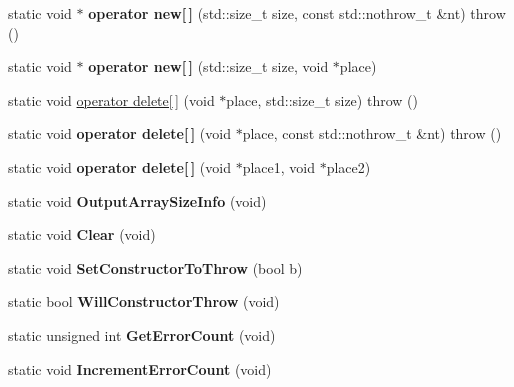 \begin{DoxyCompactItemize}
\item 
\hypertarget{classBee_a373196ddc4b115f952fab9971ffacc80}{}static void $\ast$ {\bfseries operator new\mbox{[}$\,$\mbox{]}} (std\+::size\+\_\+t size, const std\+::nothrow\+\_\+t \&nt)  throw ()\label{classBee_a373196ddc4b115f952fab9971ffacc80}

\item 
\hypertarget{classBee_a1c8abf622d253e80396da8ef80cf9391}{}static void $\ast$ {\bfseries operator new\mbox{[}$\,$\mbox{]}} (std\+::size\+\_\+t size, void $\ast$place)\label{classBee_a1c8abf622d253e80396da8ef80cf9391}

\item 
static void \hyperlink{classBee_af9dc6ba6e0aa4023eb0aad8580e2421b}{operator delete\mbox{[}$\,$\mbox{]}} (void $\ast$place, std\+::size\+\_\+t size)  throw ()
\item 
\hypertarget{classBee_a820869dbb3481a7554e52fbf4497646e}{}static void {\bfseries operator delete\mbox{[}$\,$\mbox{]}} (void $\ast$place, const std\+::nothrow\+\_\+t \&nt)  throw ()\label{classBee_a820869dbb3481a7554e52fbf4497646e}

\item 
\hypertarget{classBee_aabff14c514a6656ec1ac8571ed28aae7}{}static void {\bfseries operator delete\mbox{[}$\,$\mbox{]}} (void $\ast$place1, void $\ast$place2)\label{classBee_aabff14c514a6656ec1ac8571ed28aae7}

\item 
\hypertarget{classBee_ac1ff02f2edcfb06a0019edf9112d1c91}{}static void {\bfseries Output\+Array\+Size\+Info} (void)\label{classBee_ac1ff02f2edcfb06a0019edf9112d1c91}

\item 
\hypertarget{classBee_aa0e72cfda7b506c25065a7cf71a027f3}{}static void {\bfseries Clear} (void)\label{classBee_aa0e72cfda7b506c25065a7cf71a027f3}

\item 
\hypertarget{classBee_ac6733b4e777a4c64ea0232d5d0fc1a64}{}static void {\bfseries Set\+Constructor\+To\+Throw} (bool b)\label{classBee_ac6733b4e777a4c64ea0232d5d0fc1a64}

\item 
\hypertarget{classBee_a222234d63d32a280d1ec85e6abed1fb8}{}static bool {\bfseries Will\+Constructor\+Throw} (void)\label{classBee_a222234d63d32a280d1ec85e6abed1fb8}

\item 
\hypertarget{classBee_aae86e9900c6aa2c83ca345dba200dd2b}{}static unsigned int {\bfseries Get\+Error\+Count} (void)\label{classBee_aae86e9900c6aa2c83ca345dba200dd2b}

\item 
\hypertarget{classBee_a39a16846868cb765ef03ecc593f513c7}{}static void {\bfseries Increment\+Error\+Count} (void)\label{classBee_a39a16846868cb765ef03ecc593f513c7}

\end{DoxyCompactItemize}
